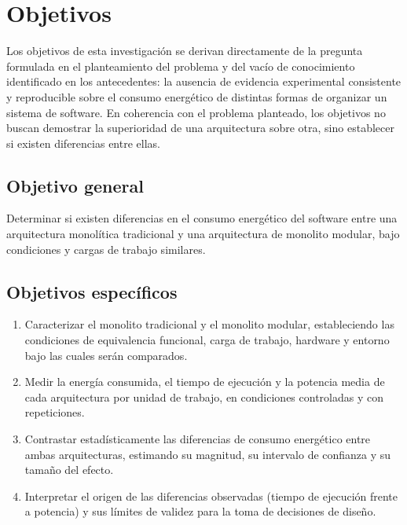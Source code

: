 \chapter{Objetivos}
\label{cap:objetivos}

Los objetivos de esta investigación se derivan directamente de la pregunta formulada en el planteamiento del problema y del vacío de conocimiento identificado en los antecedentes: la ausencia de evidencia experimental consistente y reproducible sobre el consumo energético de distintas formas de organizar un sistema de software. En coherencia con el problema planteado, los objetivos no buscan demostrar la superioridad de una arquitectura sobre otra, sino establecer si existen diferencias entre ellas.

\section{Objetivo general}

Determinar si existen diferencias en el consumo energético del software entre una arquitectura monolítica tradicional y una arquitectura de monolito modular, bajo condiciones y cargas de trabajo similares.

\section{Objetivos específicos}
\label{sec:objetivos-especificos}

\begin{enumerate}[nosep]
  \item Caracterizar el monolito tradicional y el monolito modular, estableciendo las condiciones de equivalencia funcional, carga de trabajo, hardware y entorno bajo las cuales serán comparados.
  \item Medir la energía consumida, el tiempo de ejecución y la potencia media de cada arquitectura por unidad de trabajo, en condiciones controladas y con repeticiones.
  \item Contrastar estadísticamente las diferencias de consumo energético entre ambas arquitecturas, estimando su magnitud, su intervalo de confianza y su tamaño del efecto.
  \item Interpretar el origen de las diferencias observadas (tiempo de ejecución frente a potencia) y sus límites de validez para la toma de decisiones de diseño.
\end{enumerate}
